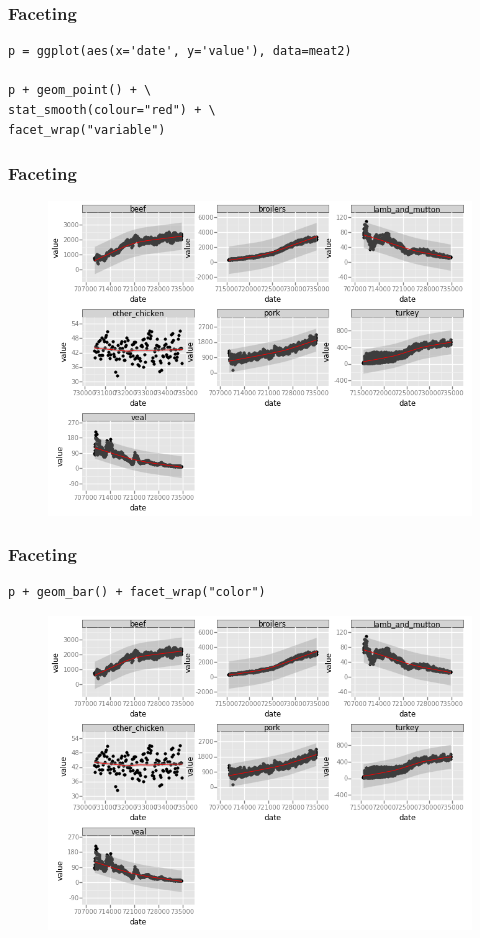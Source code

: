 \documentclass{beamer}
\begin{document}
\begin{frame}[fragile]
	\frametitle{Faceting}
	\begin{framed}
		\begin{verbatim}
p = ggplot(aes(x='date', y='value'), data=meat2)

p + geom_point() + \
stat_smooth(colour="red") + \
facet_wrap("variable")
		\end{verbatim}
		
	\end{framed}
\end{frame}
\begin{frame}
\frametitle{Faceting}
	
	\begin{figure}
		\centering
		\includegraphics[width=0.7\linewidth]{Facet1}
		\caption{}
		\label{fig:Facet1}
	\end{figure}
	
\end{frame}
\begin{frame}[fragile]
	\frametitle{Faceting}
	\begin{framed}
		\begin{verbatim}
p + geom_bar() + facet_wrap("color")
		\end{verbatim}
		
	\end{framed}
\end{frame}

\begin{frame}
	\begin{figure}
		\centering
		\includegraphics[width=0.7\linewidth]{Facet2}
		\caption{}
		\label{fig:Facet2}
	\end{figure}
	
\end{frame}
\end{document}
